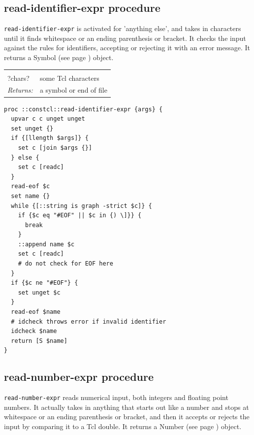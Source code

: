 \documentclass[twoside,9pt]{report}
\begin{document}
\subsection{read-identifier-expr procedure}
\label{read-identifier-expr-procedure}


\texttt{read-identifier-expr} is activated for 'anything else', and takes in characters until it finds whitespace or an ending parenthesis or bracket. It checks the input against the rules for identifiers, accepting or rejecting it with an error message. It returns a Symbol (see page \pageref{symbols}) object.

\noindent\begin{tabular}{ |p{1.5cm} p{8cm}| }
\hline
\rowcolor[HTML]{CCCCCC} \multicolumn{2}{|l|}{\bf read-identifier-expr (internal)} \\
?chars? & some Tcl characters \\
\textit{Returns:} & a symbol or end of file \\
\hline
\end{tabular}
\begin{lstlisting}
proc ::constcl::read-identifier-expr {args} {
  upvar c c unget unget
  set unget {}
  if {[llength $args]} {
    set c [join $args {}]
  } else {
    set c [readc]
  }
  read-eof $c
  set name {}
  while {[::string is graph -strict $c]} {
    if {$c eq "#EOF" || $c in {) \]}} {
      break
    }
    ::append name $c
    set c [readc]
    # do not check for EOF here
  }
  if {$c ne "#EOF"} {
    set unget $c
  }
  read-eof $name
  # idcheck throws error if invalid identifier
  idcheck $name
  return [S $name]
}
\end{lstlisting}
\subsection{read-number-expr procedure}
\label{read-number-expr-procedure}


\texttt{read-number-expr} reads numerical input, both integers and floating point numbers. It actually takes in anything that starts out like a number and stops at whitespace or an ending parenthesis or bracket, and then it accepts or rejects the input by comparing it to a Tcl double. It returns a Number (see page \pageref{numbers}) object.
\end{document}
